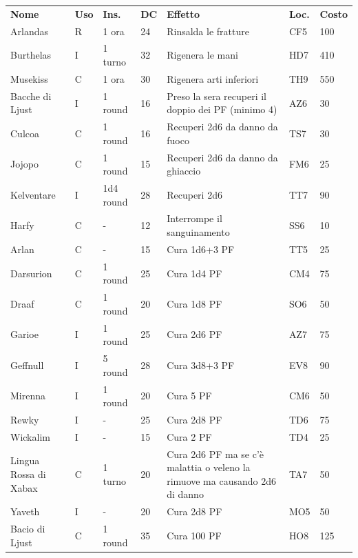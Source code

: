 \documentclass[a4paper,11pt,twoside,openany]{book}
\begin{document}
\begin{tabularx}{0.95\textwidth}{llllXll}

	\textbf{Nome}  & \textbf{Uso} & \textbf{Ins.} & \textbf{DC} & \textbf{Effetto}& \textbf{Loc.} & \textbf{Costo} \\
	Arlandas\index{Arlandas} & R  & 1 ora& 24& Rinsalda le fratture & CF5 & 100  \\
	Burthelas \index{Burthelas}   & I  & 1 turno   & 32& Rigenera le mani& HD7 & 410  \\
	Musekiss\index{Musekiss} & C  & 1 ora& 30& Rigenera arti inferiori   & TH9 & 550  \\
	Bacche di Ljust \index{Bacche di Ljust} & I  & 1 round   & 16& Preso la sera recuperi il doppio dei PF (minimo 4) & AZ6 & 30   \\
	Culcoa\index{Culcoa}& C  & 1 round   & 16& Recuperi 2d6 da danno da fuoco & TS7 & 30   \\
	Jojopo\index{Jojopo}& C  & 1 round   & 15& Recuperi 2d6 da danno da ghiaccio   & FM6 & 25   \\
	Kelventare\index{Kelventare}  & I  & 1d4 round & 28& Recuperi 2d6    & TT7 & 90   \\
	Harfy \index{Harfy} & C  & -    & 12& Interrompe il sanguinamento    & SS6 & 10   \\
	Arlan\index{Arlan}  & C  & -    & 15& Cura 1d6+3 PF   & TT5 & 25   \\
	Darsurion\index{Darsurion}    & C  & 1 round   & 25& Cura 1d4 PF& CM4 & 75   \\
	Draaf \index{Draaf} & C  & 1 round   & 20& Cura 1d8 PF& SO6 & 50   \\
	Garioe\index{Garioe}& I  & 1 round   & 25& Cura 2d6 PF& AZ7 & 75   \\
	Geffnull \index{Geffnull}& I  & 5 round   & 28& Cura 3d8+3 PF   & EV8 & 90   \\
	Mirenna\index{Mirenna}   & I  & 1 round   & 20& Cura 5 PF  & CM6 & 50   \\
	Rewky\index{Rewky}  & I  & -    & 25& Cura 2d8 PF& TD6 & 75   \\
	Wickalim\index{Wickalim} & I  & -    & 15& Cura 2 PF  & TD4 & 25   \\
	Lingua Rossa di Xabax\index{Lingua Rossa di Xabax}& C  & 1 turno   & 20& Cura 2d6 PF ma se c'è malattia o veleno la rimuove ma causando 2d6 di danno & TA7 & 50   \\
	Yaveth\index{Yaveth}& I  & -    & 20& Cura 2d8 PF& MO5 & 50   \\
	Bacio di Ljust\index{Bacio di Ljust}    & C  & 1 round   & 35& Cura 100 PF& HO8 & 125  \\

\end{tabularx}
\end{document}
